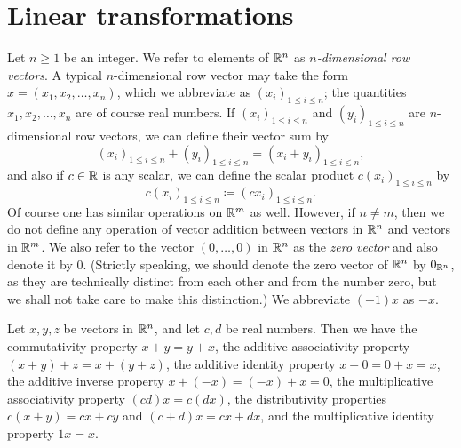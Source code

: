 \section{Linear transformations}\label{ii:sec:6.1}

\begin{defn}\label{ii:6.1.1}
  Let \(n \geq 1\) be an integer.
  We refer to elements of \(\mathbb{R}^n\) as \emph{\(n\)-dimensional row vectors}.
  A typical \(n\)-dimensional row vector may take the form \(x = (x_1, x_2, \dots, x_n)\), which we abbreviate as \((x_i)_{1 \leq i \leq n}\);
  the quantities \(x_1, x_2, \dots, x_n\) are of course real numbers.
  If \((x_i)_{1 \leq i \leq n}\) and \((y_i)_{1 \leq i \leq n}\) are \(n\)-dimensional row vectors, we can define their vector sum by
  \[
    (x_i)_{1 \leq i \leq n} + (y_i)_{1 \leq i \leq n} = (x_i + y_i)_{1 \leq i \leq n},
  \]
  and also if \(c \in \mathbb{R}\) is any scalar, we can define the scalar product \(c (x_i)_{1 \leq i \leq n}\) by
  \[
    c (x_i)_{1 \leq i \leq n} \coloneqq (cx_i)_{1 \leq i \leq n}.
  \]
  Of course one has similar operations on \(\mathbb{R}^m\) as well.
  However, if \(n \neq m\), then we do not define any operation of vector addition between vectors in \(\mathbb{R}^n\) and vectors in \(\mathbb{R}^m\).
  We also refer to the vector \((0, \dots, 0)\) in \(\mathbb{R}^n\) as the \emph{zero vector} and also denote it by \(0\).
  (Strictly speaking, we should denote the zero vector of \(\mathbb{R}^n\) by \(0_{\mathbb{R}^n}\), as they are technically distinct from each other and from the number zero, but we shall not take care to make this distinction.)
  We abbreviate \((-1) x\) as \(-x\).
\end{defn}

\begin{lem}\label{ii:6.1.2}
  Let \(x, y, z\) be vectors in \(\mathbb{R}^n\), and let \(c, d\) be real numbers.
  Then we have the commutativity property \(x + y = y + x\), the additive associativity property \((x + y) + z = x + (y + z)\), the additive identity property \(x + 0 = 0 + x = x\), the additive inverse property \(x + (-x) = (-x) + x = 0\), the multiplicative associativity property \((cd)x = c(dx)\), the distributivity properties \(c(x + y) = cx + cy\) and \((c + d)x = cx + dx\), and the multiplicative identity property \(1x = x\).
\end{lem}

